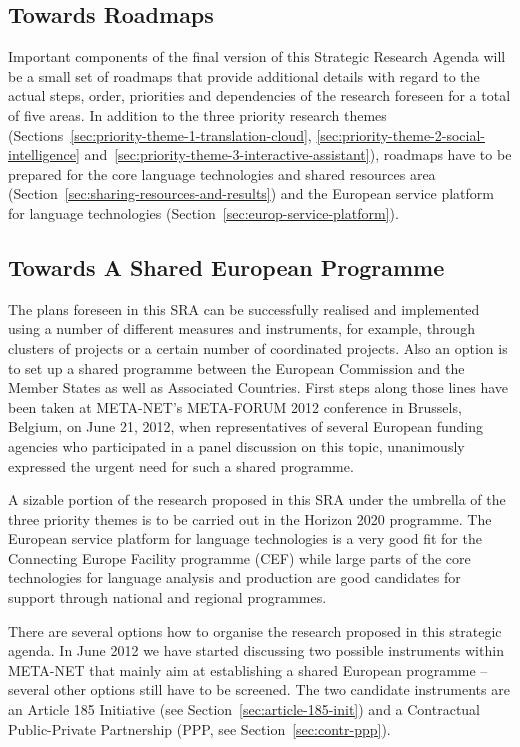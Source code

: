\documentclass[10pt, plain]{../../metanetpaper}
\begin{document}
\begin{multicols}{2}
\subsection{Towards Roadmaps}
\label{sec:roadmaps}

Important components of the final version of this Strategic Research Agenda will be a small set of roadmaps that provide additional details with regard to the actual steps, order, priorities and dependencies of the research foreseen for a total of five areas. In addition to the three priority research themes (Sections~\ref{sec:priority-theme-1-translation-cloud}, \ref{sec:priority-theme-2-social-intelligence} and~\ref{sec:priority-theme-3-interactive-assistant}), roadmaps have to be prepared for the core language technologies and shared resources area (Section~\ref{sec:sharing-resources-and-results}) and the European service platform for language technologies (Section~\ref{sec:europ-service-platform}).

\subsection{Towards A Shared European Programme}
\label{sec:towards-shar-europ}

The plans foreseen in this SRA can be successfully realised and implemented using a number of different measures and instruments, for example, through clusters of projects or a certain number of coordinated projects. Also an option is to set up a shared programme between the European Commission and the Member States as well as Associated Countries. First steps along those lines have been taken at META-NET's META-FORUM 2012 conference in Brussels, Belgium, on June 21, 2012, when representatives of several European funding agencies who participated in a panel discussion on this topic, unanimously expressed the urgent need for such a shared programme.

A sizable portion of the research proposed in this SRA under the umbrella of the three priority themes is to be carried out in the Horizon 2020 programme. The European service platform for language technologies is a very good fit for the Connecting Europe Facility programme (CEF) while large parts of the core technologies for language analysis and production are good candidates for support through national and regional programmes.

There are several options how to organise the research proposed in this strategic agenda. In June 2012 we have started discussing two possible instruments within META-NET that mainly aim at establishing a shared European programme -- several other options still have to be screened. The two candidate instruments are an Article 185 Initiative (see Section~\ref{sec:article-185-init}) and a Contractual Public-Private Partnership (PPP, see Section~\ref{sec:contr-ppp}).


\end{multicols}
\end{document}
